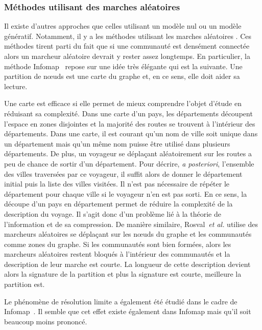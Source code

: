 \subsubsection{Méthodes utilisant des marches aléatoires}
Il existe d'autres approches que celles utilisant un modèle nul ou un modèle génératif.
Notamment, il y a les méthodes utilisant les marches aléatoires \cite{Pons2005,Rosvall2008}.
Ces méthodes tirent parti du fait que si une communauté est densément connectée alors un marcheur aléatoire devrait y rester assez longtemps.
En particulier, la méthode Infomap~\cite{Rosvall2008} repose sur une idée très élégante qui est la suivante.
Une partition de n\oe uds est une carte du graphe et, en ce sens, elle doit aider sa lecture.

Une carte est efficace si elle permet de mieux comprendre l'objet d'étude en réduisant sa complexité.
Dans une carte d'un pays, les départements découpent l'espace en zones disjointes et la majorité des routes se trouvent à l'intérieur des départements.
Dans une carte, il est courant qu'un nom de ville soit unique dans un département mais qu'un même nom puisse être utilisé dans plusieurs départements.
De plus, un voyageur se déplaçant aléatoirement sur les routes a peu de chance de sortir d'un département.
Pour décrire, \emph{a posteriori}, l'ensemble des villes traversées par ce voyageur, il suffit alors de donner le département initial puis la liste des villes visitées.
Il n'est pas nécessaire de répéter le département pour chaque ville si le voyageur n'en est pas sorti.
En ce sens, la découpe d'un pays en département permet de réduire la complexité de la description du voyage.
Il s'agit donc d'un problème lié à la théorie de l'information et de sa compression.
De manière similaire, Rosval~\emph{et al.} utilise des marcheurs aléatoires se déplaçant sur les n\oe uds du graphe et les communautés comme zones du graphe.
Si les communautés sont bien formées, alors les marcheurs aléatoires restent bloqués à l'intérieur des communautés et la description de leur marche est courte.
La longueur de cette description devient alors la signature de la partition et plus la signature est courte, meilleure la partition est.

Le phénomène de résolution limite a également été étudié dans le cadre de Infomap~\cite{Kawamoto2015}.
Il semble que cet effet existe également dans Infomap mais qu'il soit beaucoup moins prononcé.


